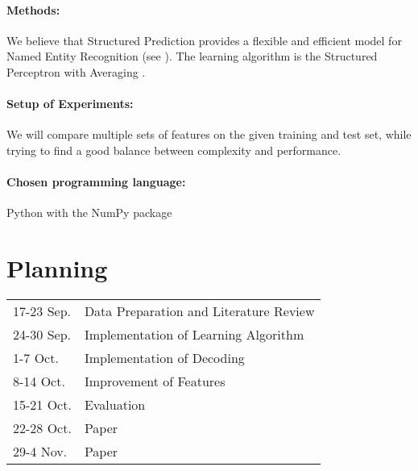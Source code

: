 \documentclass[a4paper,10pt]{article}
\begin{document}
\paragraph{Methods:}
We believe that Structured Prediction provides a flexible and efficient model for Named Entity Recognition (see \cite{strlearn}).
The learning algorithm is the Structured Perceptron with Averaging \cite{Collins:2002:DTM:1118693.1118694}.



% 
\paragraph{Setup of Experiments:}
We will compare multiple sets of features on the given training and test set, 
while trying to find a good balance between complexity and performance.


\paragraph{Chosen programming language:}
Python with the NumPy package


\section*{Planning}

\begin{table}[h!]
\begin{tabular}{l l}
17-23 Sep. & Data Preparation and Literature Review \\
24-30 Sep. & Implementation of Learning Algorithm\\
1-7 Oct.   & Implementation of Decoding\\
8-14 Oct.  & Improvement of Features\\
15-21 Oct. & Evaluation \\
22-28 Oct. & Paper \\
29-4 Nov.  & Paper\\
\end{tabular}
\end{table}




{\small


}
\end{document}

